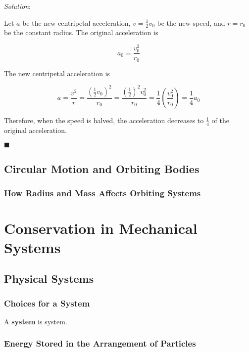 \documentclass[dvipsnames]{article}
\newif\ifShowUnitVIII                            %
\begin{document}
\textit{Solution}:

Let $a$ be the new centripetal acceleration, $v = \frac{1}{2}v_0$ be the new speed, and $r = r_0$ be the constant radius. The original acceleration is

\begin{equation*}
    a_0 = \frac{v_0^2}{r_0}
\end{equation*}


The new centripetal acceleration is

\begin{equation*}
    a = \frac{v^2}{r} = \frac{\left(\frac{1}{2}v_0\right)^2}{r_0} = \frac{\left(\frac{1}{2}\right)^2v_0^2}{r_0} = \frac{1}{4} \left(\frac{v_0^2}{r_0}\right) = \frac{1}{4} a_0
\end{equation*}

Therefore, when the speed is halved, the acceleration decreases to $\frac{1}{4}$ of the original acceleration.

\hfill $\blacksquare$



\subsection{Circular Motion and Orbiting Bodies}

\subsubsection{How Radius and Mass Affects Orbiting Systems}

\fi

\clearpage

\section{Conservation in Mechanical Systems}

\ifShowUnitVIII

\subsection{Physical Systems}

\subsubsection{Choices for a System}

A \textbf{\gls{system}} is \glsdesc{system}.

\subsubsection{Energy Stored in the Arrangement of Particles}
\end{document}
